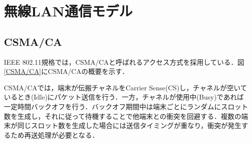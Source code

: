 \documentclass[a4paper, 10pt]{ltjsarticle}
\begin{document}
\section{無線LAN通信モデル}


\subsection{CSMA/CA}

IEEE 802.11規格では，CSMA/CAと呼ばれるアクセス方式を採用している．図\ref{CSMA/CA}にCSMA/CAの概要を示す．


CSMA/CAでは，端末が伝搬チャネルをCarrier Sense(CS)し，チャネルが空いているとき(Idle)にパケット送信を行う．一方，チャネルが使用中(Busy)であれば一定時間バックオフを行う．バックオフ期間中は端末ごとにランダムにスロット数を生成し，それに従って待機することで他端末との衝突を回避する．複数の端末が同じスロット数を生成した場合には送信タイミングが重なり，衝突が発生するため再送処理が必要となる．
\end{document}
